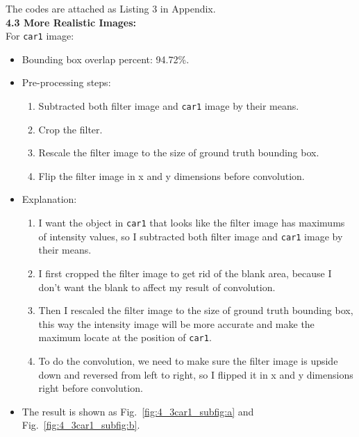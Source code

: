\documentclass{assignment}
\begin{document}
\begin{problemlist}
The codes are attached as Listing 3 in Appendix.\\

\newpage
\textbf{4.3 More Realistic Images:}\\
For \texttt{car1} image:
\begin{itemize}
    \item Bounding box overlap percent: 94.72\%.
    \item Pre-processing steps: 
    \begin{enumerate}[label={\alph*)}]
        \item Subtracted both filter image and \texttt{car1} image by their means.
        \item Crop the filter.
        \item Rescale the filter image to the size of ground truth bounding box.
        \item Flip the filter image in x and y dimensions before convolution.
    \end{enumerate}
    \item Explanation: 
    \begin{enumerate}[label={\alph*)}]
        \item I want the object in \texttt{car1} that looks like the filter image has maximums of intensity values, so I subtracted both filter image and \texttt{car1} image by their means.
        \item I first cropped the filter image to get rid of the blank area, because I don't want the blank to affect my result of convolution.
        \item Then I rescaled the filter image to the size of ground truth bounding box, this way the intensity image will be more accurate and make the maximum locate at the position of \texttt{car1}.
        \item To do the convolution, we need to make sure the filter image is upside down and reversed from left to right, so I flipped it in x and y dimensions right before convolution.
    \end{enumerate}
    \item The result is shown as Fig.~\ref{fig:4_3car1_subfig:a} and Fig.~\ref{fig:4_3car1_subfig:b}.
\end{itemize}


\end{problemlist}
\end{document}
